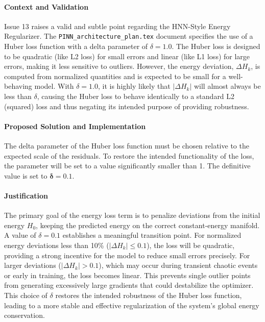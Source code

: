 \documentclass[11pt, a4paper]{article}
\begin{document}
\paragraph{Context and Validation}
Issue 13 raises a valid and subtle point regarding the HNN-Style Energy Regularizer. The \texttt{PINN\_architecture\_plan.tex} document specifies the use of a Huber loss function with a delta parameter of $\delta = 1.0$. The Huber loss is designed to be quadratic (like L2 loss) for small errors and linear (like L1 loss) for large errors, making it less sensitive to outliers. However, the energy deviation, $\Delta H_k$, is computed from normalized quantities and is expected to be small for a well-behaving model. With $\delta = 1.0$, it is highly likely that $|\Delta H_k|$ will almost always be less than $\delta$, causing the Huber loss to behave identically to a standard L2 (squared) loss and thus negating its intended purpose of providing robustness.

\paragraph{Proposed Solution and Implementation}
The delta parameter of the Huber loss function must be chosen relative to the expected scale of the residuals. To restore the intended functionality of the loss, the parameter will be set to a value significantly smaller than 1. The definitive value is set to $\boldsymbol{\delta = 0.1}$.

\paragraph{Justification}
The primary goal of the energy loss term is to penalize deviations from the initial energy $H_0$, keeping the predicted energy on the correct constant-energy manifold. A value of $\delta = 0.1$ establishes a meaningful transition point. For normalized energy deviations less than 10\% ($|\Delta H_k| \leq 0.1$), the loss will be quadratic, providing a strong incentive for the model to reduce small errors precisely. For larger deviations ($|\Delta H_k| > 0.1$), which may occur during transient chaotic events or early in training, the loss becomes linear. This prevents single outlier points from generating excessively large gradients that could destabilize the optimizer. This choice of $\delta$ restores the intended robustness of the Huber loss function, leading to a more stable and effective regularization of the system's global energy conservation.
\end{document}
